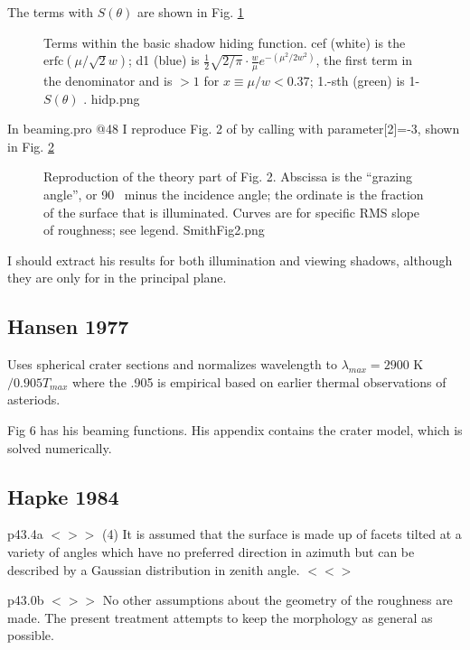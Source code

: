 \documentclass{article}
\newcommand{\erfc}{\mathrm{erfc}}  %
\newcommand{\bq}{$ < \! > \!   \! >$ } %
\newcommand{\eq}{ $< \! \! < \! > $ } %
\begin{document}
The terms with $S(\theta)$ are shown in Fig.
\ref{hidp}
\begin{figure}[!ht] 
\caption[Terms within the shadow function]{Terms within the basic shadow hiding
  function. cef (white) is the $ \erfc \left( \mu / \sqrt{2} w \right)$; d1
  (blue) is $\frac{1}{2} \sqrt{2/\pi} \cdot \frac{w}{\mu}
  e^{-(\mu^2/2w^2)}$, the first term in the denominator and is $>1$
  for $x\equiv \mu/w < 0.37$; 1.-sth (green) is 1-$S(\theta)$ .
\label{hidp}  hidp.png  }
\end{figure} 

In beaming.pro @48 I reproduce Fig. 2 of  by calling
 with parameter[2]=-3, shown in Fig.  \ref{SmithFig2}
\begin{figure}[!ht] 
\caption[Smith Fig. 2]{Reproduction of the theory part of 
  Fig. 2. Abscissa is the ``grazing angle'', or 90\qd~ minus the incidence
  angle; the ordinate is the fraction of the surface that is illuminated. Curves
  are for specific RMS slope of roughness; see legend. \label{SmithFig2}
  SmithFig2.png }
\end{figure} 

 I should extract his results for both illumination and viewing shadows,
 although they are only for in the principal plane.

\subsection{Hansen  1977} %
Uses spherical crater sections and normalizes wavelength to $\lambda_{max} =2900
$ \um \qd K $/0.905 T_{max}$ where the .905 is empirical based on earlier
thermal observations of asteriods.

Fig 6 has his beaming functions.  His appendix contains the crater model, which
is solved numerically.

\subsection{Hapke 1984} %

p43.4a \bq (4) It is assumed that the surface is made up of facets tilted at a
variety of angles which have no preferred direction in azimuth but can be
described by a Gaussian distribution in zenith angle. \eq 

p43.0b \bq No other assumptions about the geometry of the roughness are
made. The present treatment attempts to keep the morphology as general as
possible.
\end{document}
